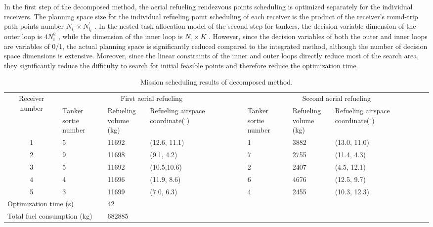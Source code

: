 In the first step of the decomposed method, the aerial refueling rendezvous points scheduling is optimized separately for the individual receivers. The planning space size for the individual refueling point scheduling of each receiver is the product of the receiver's round-trip path points number $N_{i_{\text{r}}}\times N_{i_{\text{r}}}^{\prime}$ . In the nested task allocation model of the second step for tankers, the decision variable dimension of the outer loop is $4N_{\text{r}}^{2}$ , while the dimension of the inner loop is $N_{\text{t}}\times K$ . However, since the decision variables of both the outer and inner loops are variables of 0/1, the actual planning space is significantly reduced compared to the integrated method, although the number of decision space dimensions is extensive. Moreover, since the linear constraints of the inner and outer loops directly reduce most of the search area, they significantly reduce the difficulty to search for initial feasible points and therefore reduce the optimization time.

\begin{table}
	\caption{Mission scheduling results of decomposed method.}
	\begin{centering}
		\begin{tabular}{c|l|l|l|l|l|l}
			\hline
			\multirow{2}{*}{Receiver number}& \multicolumn{3}{c|}{First aerial refueling} & \multicolumn{3}{c}{Second aerial refueling} \\\cline{2-7}
			& \tabincell{l}{Tanker sortie\\number}& \tabincell{l}{Refueling\\volume (kg)}&\tabincell{l}{Refueling airspace \\coordinate($^{\circ}$)}&\tabincell{l}{Tanker sortie\\number}&\tabincell{l}{Refueling\\volume (kg)}&\tabincell{l}{Refueling airspace \\coordinate($^{\circ}$)} \\
			\hline
			1 & 5& 11692& (12.6, 11.1)&1&3882&(13.0, 11.0) \\
			2 & 9& 11698& (9.1, 4.2)&7&2755&(11.4, 4.3) \\
			3 & 5& 11692& (10.5,10.6)&2&2407&(4.5, 12.1) \\
			4 & 4& 11696& (11.9, 8.6)&6&4676&(12.5, 9.7) \\
			5 & 3& 11699& (7.0, 6.3)&4&2455&(10.3, 12.3) \\\hline
			\multicolumn{2}{l}{Optimization time (s)}& \multicolumn{5}{l}{42}\\
			\multicolumn{2}{l}{Total fuel consumption (kg)}& \multicolumn{5}{l}{682885}\\
			\hline 
		\end{tabular}
		\par\end{centering}
	\centering{}
	\label{Tab_15.7}
\end{table}




